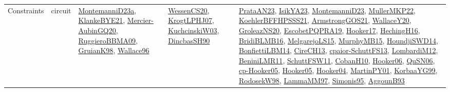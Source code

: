 {\begin{longtable}{lp{3cm}>{\raggedright}p{6cm}>{\raggedright}p{6cm}p{8cm}}
Constraints & circuit & \href{articles/MontemanniD23a.pdf}{MontemanniD23a}\cite{MontemanniD23a}, \href{papers/KlankeBYE21.pdf}{KlankeBYE21}\cite{KlankeBYE21}, \href{papers/Mercier-AubinGQ20.pdf}{Mercier-AubinGQ20}\cite{Mercier-AubinGQ20}, \href{articles/RuggieroBBMA09.pdf}{RuggieroBBMA09}\cite{RuggieroBBMA09}, \href{papers/GruianK98.pdf}{GruianK98}\cite{GruianK98}, \href{articles/Wallace96.pdf}{Wallace96}\cite{Wallace96} & \href{papers/WessenCS20.pdf}{WessenCS20}\cite{WessenCS20}, \href{papers/KrogtLPHJ07.pdf}{KrogtLPHJ07}\cite{KrogtLPHJ07}, \href{articles/KuchcinskiW03.pdf}{KuchcinskiW03}\cite{KuchcinskiW03}, \href{articles/DincbasSH90.pdf}{DincbasSH90}\cite{DincbasSH90} & \href{articles/PrataAN23.pdf}{PrataAN23}\cite{PrataAN23}, \href{articles/IsikYA23.pdf}{IsikYA23}\cite{IsikYA23}, \href{articles/MontemanniD23.pdf}{MontemanniD23}\cite{MontemanniD23}, \href{articles/MullerMKP22.pdf}{MullerMKP22}\cite{MullerMKP22}, \href{articles/KoehlerBFFHPSSS21.pdf}{KoehlerBFFHPSSS21}\cite{KoehlerBFFHPSSS21}, \href{papers/ArmstrongGOS21.pdf}{ArmstrongGOS21}\cite{ArmstrongGOS21}, \href{articles/WallaceY20.pdf}{WallaceY20}\cite{WallaceY20}, \href{papers/GroleazNS20.pdf}{GroleazNS20}\cite{GroleazNS20}, \href{articles/EscobetPQPRA19.pdf}{EscobetPQPRA19}\cite{EscobetPQPRA19}, \href{papers/Hooker17.pdf}{Hooker17}\cite{Hooker17}, \href{papers/HechingH16.pdf}{HechingH16}\cite{HechingH16}, \href{articles/BridiBLMB16.pdf}{BridiBLMB16}\cite{BridiBLMB16}, \href{papers/MelgarejoLS15.pdf}{MelgarejoLS15}\cite{MelgarejoLS15}, \href{papers/MurphyMB15.pdf}{MurphyMB15}\cite{MurphyMB15}, \href{papers/HoundjiSWD14.pdf}{HoundjiSWD14}\cite{HoundjiSWD14}, \href{articles/BonfiettiLBM14.pdf}{BonfiettiLBM14}\cite{BonfiettiLBM14}, \href{papers/CireCH13.pdf}{CireCH13}\cite{CireCH13}, \href{papers/cpaior-SchuttFS13.pdf}{cpaior-SchuttFS13}\cite{cpaior-SchuttFS13}, \href{articles/LombardiM12.pdf}{LombardiM12}\cite{LombardiM12}, \href{articles/BeniniLMR11.pdf}{BeniniLMR11}\cite{BeniniLMR11}, \href{articles/SchuttFSW11.pdf}{SchuttFSW11}\cite{SchuttFSW11}, \href{papers/CobanH10.pdf}{CobanH10}\cite{CobanH10}, \href{articles/Hooker06.pdf}{Hooker06}\cite{Hooker06}, \href{papers/QuSN06.pdf}{QuSN06}\cite{QuSN06}, \href{papers/cp-Hooker05.pdf}{cp-Hooker05}\cite{cp-Hooker05}, \href{articles/Hooker05.pdf}{Hooker05}\cite{Hooker05}, \href{papers/Hooker04.pdf}{Hooker04}\cite{Hooker04}, \href{articles/MartinPY01.pdf}{MartinPY01}\cite{MartinPY01}, \href{papers/KorbaaYG99.pdf}{KorbaaYG99}\cite{KorbaaYG99}, \href{papers/RodosekW98.pdf}{RodosekW98}\cite{RodosekW98}, \href{articles/LammaMM97.pdf}{LammaMM97}\cite{LammaMM97}, \href{papers/Simonis95.pdf}{Simonis95}\cite{Simonis95}, \href{articles/AggounB93.pdf}{AggounB93}\cite{AggounB93}\\

\end{longtable}}

